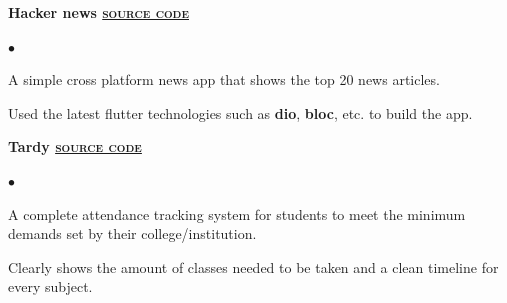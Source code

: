 \documentclass[10pt,a4paper]{extarticle}
\newcommand{\myProjectItem}[2]{
	\item {
	            \color{resumeBlueDark}
	            \textbf{#1}}\\#2
}
\begin{document}
\begin{minipage}{0.55\textwidth}
\begin{list}{{\color{resumeBlueLight}}}{\leftmargin 1mm}
		\myProjectItem{Hacker news
		\hfill {\href{https://github.com/KunalRaghav/hacker_news}{\color{black}{\fontAwesomeBrands github} \textsc{source code}}}
		}{
			\vspace{-6mm}
			\begin{list}{\color{resumeBlueLight}$\bullet$}{\leftmargin 3mm}
				\item{A simple cross platform news app that shows the top 20 news articles.}
				\vspace{-1mm}
				\item{Used the latest flutter technologies such as \textbf{dio}, \textbf{bloc}, etc. to build the app.}
			\end{list}
			\vspace{-2mm}
        }
		\myProjectItem{Tardy
		\hfill {\href{https://github.com/KunalRaghav/Tardy/}{\color{black}{\fontAwesomeBrands github} \textsc{source code}}}
		}{
			\vspace{-6mm}
			\begin{list}{\color{resumeBlueLight}$\bullet$}{\leftmargin 3mm}
				\item{A complete attendance tracking system for students to meet the minimum demands set by their college/institution.}
				\vspace{-1mm}
				\item{Clearly shows the amount of classes needed to be taken and a clean timeline for every subject.}
			\end{list}
			\vspace{-2mm}
		}


\end{list}
\end{minipage}
\end{document}
